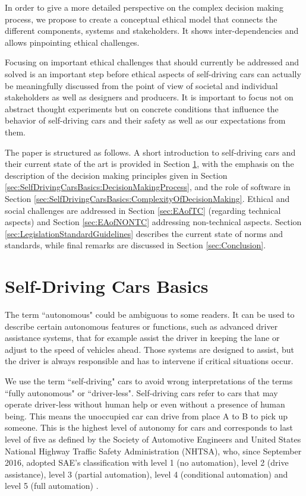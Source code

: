 In order to give a more detailed perspective on the complex decision making process, we propose to create a conceptual ethical model that connects the different components, systems and stakeholders. It shows inter-dependencies and allows pinpointing ethical challenges.

Focusing on important ethical challenges that should currently be addressed and solved is an important step before ethical aspects of self-driving cars can actually be meaningfully discussed from the point of view of societal and individual stakeholders as well as designers and producers. It is important to focus not on abstract thought experiments but on concrete conditions that influence the behavior of self-driving cars and their safety as well as our expectations from them.

The paper is structured as follows. A short introduction to self-driving cars and their current state of the art is provided in Section \ref{sec:SelfDrivingCarsBasics}, with the emphasis on the description of the decision making principles given in Section \ref{sec:SelfDrivingCarsBasics:DecisionMakingProcess}, and the role of software in Section \ref{sec:SelfDrivingCarsBasics:ComplexityOfDecisionMaking}. Ethical and social challenges are addressed in Section \ref{sec:EAofTC} (regarding technical aspects) and Section \ref{sec:EAofNONTC} addressing non-technical aspects. Section \ref{sec:LegislationStandardGuidelines} describes the current state of norms and standards, while final remarks are discussed in Section \ref{sec:Conclusion}.


\section{Self-Driving Cars Basics}
\label{sec:SelfDrivingCarsBasics}

The term ``autonomous" could be ambiguous to some readers. It can be used to describe certain autonomous features or functions, such as advanced driver assistance systems, that for example assist the driver in keeping the lane or adjust to the speed of vehicles ahead. Those systems are designed to assist, but the driver is always responsible and has to intervene if critical situations occur. 

We use the term ``self-driving" cars to avoid wrong interpretations of the terms ``fully autonomous" or ``driver-less". Self-driving cars refer to cars that may operate driver-less without human help or even without a presence of human being. This means the unoccupied car can drive from place A to B to pick up someone. This is the highest level of autonomy for cars and corresponds to last level of five as defined by the Society of Automotive Engineers \cite{SAE2016} and United States National Highway Traffic Safety Administration (NHTSA), who, since September 2016, adopted SAE's classification with level 1 (no automation), level 2 (drive assistance), level 3 (partial automation), level 4 (conditional automation) and level 5 (full automation) \cite[p.9]{NationalHighwayTrafficSafetyAdministrationNHTSA2016}.

